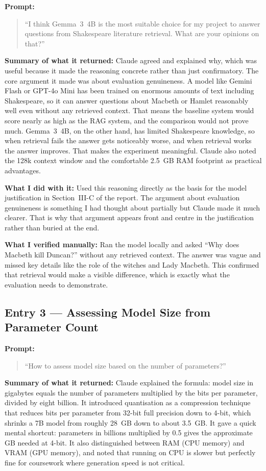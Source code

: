\documentclass[10pt,conference]{IEEEtran}
\begin{document}
\textbf{Prompt:}
\begin{quote}
``I think Gemma~3~4B is the most suitable choice for my project to answer
questions from Shakespeare literature retrieval. What are your opinions
on that?''
\end{quote}

\textbf{Summary of what it returned:}
Claude agreed and explained why, which was useful because it made the
reasoning concrete rather than just confirmatory. The core argument it
made was about evaluation genuineness. A model like Gemini Flash or
GPT-4o Mini has been trained on enormous amounts of text including
Shakespeare, so it can answer questions about Macbeth or Hamlet
reasonably well even without any retrieved context. That means the
baseline system would score nearly as high as the RAG system, and the
comparison would not prove much. Gemma~3~4B, on the other hand, has
limited Shakespeare knowledge, so when retrieval fails the answer gets
noticeably worse, and when retrieval works the answer improves. That
makes the experiment meaningful. Claude also noted the 128k context
window and the comfortable 2.5~GB RAM footprint as practical advantages.

\textbf{What I did with it:}
Used this reasoning directly as the basis for the model justification in
Section~III-C of the report. The argument about evaluation genuineness
is something I had thought about partially but Claude made it much
clearer. That is why that argument appears front and centre in the
justification rather than buried at the end.

\textbf{What I verified manually:}
Ran the model locally and asked ``Why does Macbeth kill Duncan?'' without
any retrieved context. The answer was vague and missed key details like
the role of the witches and Lady Macbeth. This confirmed that retrieval
would make a visible difference, which is exactly what the evaluation
needs to demonstrate.

\subsection*{Entry 3 --- Assessing Model Size from Parameter Count}

\textbf{Prompt:}
\begin{quote}
``How to assess model size based on the number of parameters?''
\end{quote}

\textbf{Summary of what it returned:}
Claude explained the formula: model size in gigabytes equals the number
of parameters multiplied by the bits per parameter, divided by eight
billion. It introduced quantisation as a compression technique that
reduces bits per parameter from 32-bit full precision down to 4-bit,
which shrinks a 7B model from roughly 28~GB down to about 3.5~GB.
It gave a quick mental shortcut: parameters in billions multiplied by
0.5 gives the approximate GB needed at 4-bit. It also distinguished
between RAM (CPU memory) and VRAM (GPU memory), and noted that running
on CPU is slower but perfectly fine for coursework where generation
speed is not critical.
\end{document}
